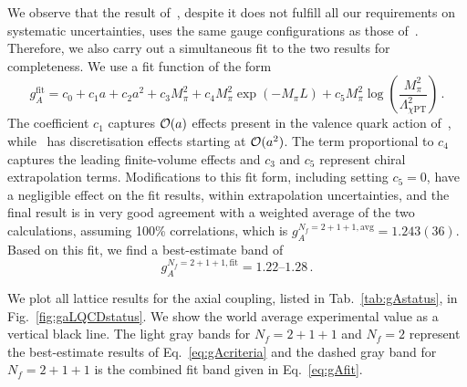 We observe that the result of~\cite{Berkowitz:2017gql}, despite it does
not fulfill all our requirements on systematic uncertainties, uses the same 
gauge configurations as those of~\cite{Bhattacharya:2016zcn}.
%
Therefore, we also carry out a simultaneous fit to the two results for
completeness.
%
We use a fit function of the form
\begin{equation}
g_A^{\mathrm{fit}} 
= 
c_0 + 
c_1a + 
c_2a^2 + 
c_3M_\pi^2 + 
c_4M_\pi^2 \exp(-M_\pi L) +
c_5M_\pi^2 \log\left(\frac{M_\pi^2}{\Lambda_{\chi \mathrm{PT}}^2}\right)\,.
\end{equation}
%
The coefficient $c_1$ captures ${\cal O}(a)$ effects present in the valence 
quark action of~\cite{Bhattacharya:2016zcn}, while~\cite{Berkowitz:2017gql} 
has discretisation effects starting at ${\cal O}(a^2)$. 
%
The term proportional to $c_4$ captures the leading finite-volume effects and 
$c_3$ and $c_5$ represent chiral extrapolation terms. 
%
Modifications to this fit form, including  setting $c_5=0$, have a negligible 
effect on the fit results, within extrapolation uncertainties, and the final 
result is in very good agreement with a weighted average of the two 
calculations, assuming 100\% correlations, which is 
$g_A^{N_f=2+1+1,\mathrm{avg}} = 1.243(36)$. 
%
Based on this fit, we find a best-estimate band of
\begin{equation}\label{eq:gAfit}
g_A^{N_f=2+1+1,\mathrm{fit}} = \numrange{1.22}{1.28}\,.
\end{equation}

We plot all lattice results for the axial coupling, listed in 
Tab.~\ref{tab:gAstatus}, in Fig.~\ref{fig:gaLQCDstatus}. 
%
We show the world average experimental value as a vertical black line. 
%
The light gray bands for $N_f=2+1+1$ and $N_f=2$ represent the best-estimate 
results of Eq.~\eqref{eq:gAcriteria} and the dashed gray band for
$N_f=2+1+1$ is the combined fit band given in Eq.~\eqref{eq:gAfit}. 
%

